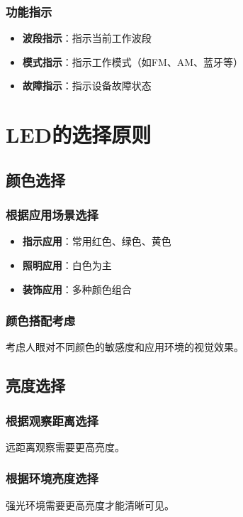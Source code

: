 \subsubsection{功能指示}
\begin{itemize}
    \item \textbf{波段指示}：指示当前工作波段
    \item \textbf{模式指示}：指示工作模式（如FM、AM、蓝牙等）
    \item \textbf{故障指示}：指示设备故障状态
\end{itemize}

\section{LED的选择原则}
\label{sec:led_selection}

\subsection{颜色选择}

\subsubsection{根据应用场景选择}
\begin{itemize}
    \item \textbf{指示应用}：常用红色、绿色、黄色
    \item \textbf{照明应用}：白色为主
    \item \textbf{装饰应用}：多种颜色组合
\end{itemize}

\subsubsection{颜色搭配考虑}
考虑人眼对不同颜色的敏感度和应用环境的视觉效果。

\subsection{亮度选择}

\subsubsection{根据观察距离选择}
远距离观察需要更高亮度。

\subsubsection{根据环境亮度选择}
强光环境需要更高亮度才能清晰可见。

